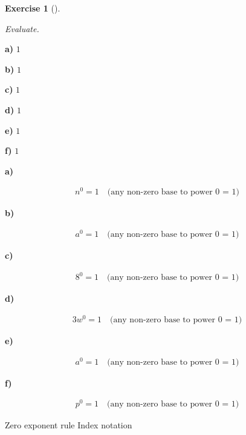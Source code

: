 \documentclass[
  letterpaper,
  DIV=11,
  numbers=noendperiod]{scrreprt}
\theoremstyle{definition}
\newtheorem{exercise}{Exercise}[chapter]
\theoremstyle{remark}
\begin{document}
\begin{exercise}[]\protect\hypertarget{exr-u2-21}{}\label{exr-u2-21}

\emph{Evaluate.}

\textbf{a)} \(\displaystyle 1\)

\textbf{b)} \(\displaystyle 1\)

\textbf{c)} \(\displaystyle 1\)

\textbf{d)} \(\displaystyle 1\)

\textbf{e)} \(\displaystyle 1\)

\textbf{f)} \(\displaystyle 1\)

\begin{tcolorbox}[enhanced jigsaw, opacitybacktitle=0.6, coltitle=black, arc=.35mm, colframe=quarto-callout-tip-color-frame, colback=white, bottomrule=.15mm, left=2mm, colbacktitle=quarto-callout-tip-color!10!white, titlerule=0mm, opacityback=0, title=\textcolor{quarto-callout-tip-color}{\faLightbulb}\hspace{0.5em}{🔍 View Solutions}, leftrule=.75mm, breakable, rightrule=.15mm, bottomtitle=1mm, toptitle=1mm, toprule=.15mm]

\textbf{a)}

\[
\begin{aligned}
n^{0}=1\quad\text{(any non-zero base to power 0 = 1)}
\end{aligned}
\]

\textbf{b)}

\[
\begin{aligned}
a^{0}=1\quad\text{(any non-zero base to power 0 = 1)}
\end{aligned}
\]

\textbf{c)}

\[
\begin{aligned}
8^{0}=1\quad\text{(any non-zero base to power 0 = 1)}
\end{aligned}
\]

\textbf{d)}

\[
\begin{aligned}
3w^{0}=1\quad\text{(any non-zero base to power 0 = 1)}
\end{aligned}
\]

\textbf{e)}

\[
\begin{aligned}
a^{0}=1\quad\text{(any non-zero base to power 0 = 1)}
\end{aligned}
\]

\textbf{f)}

\[
\begin{aligned}
p^{0}=1\quad\text{(any non-zero base to power 0 = 1)}
\end{aligned}
\]

\end{tcolorbox}

{Zero exponent rule} {Index notation}

\end{exercise}
\end{document}
